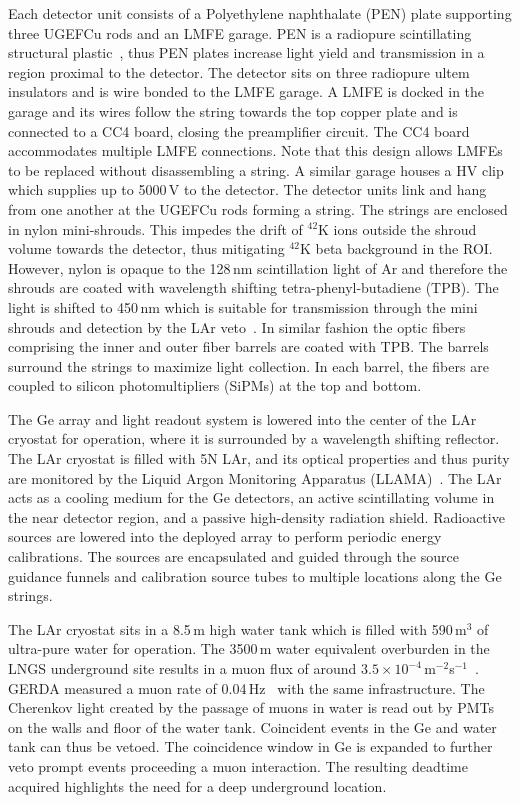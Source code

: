 Each detector unit consists of a Polyethylene naphthalate (PEN) plate supporting three UGEFCu rods and an LMFE garage. PEN is a radiopure scintillating structural plastic~\cite{pen}, thus PEN plates increase light yield and transmission in a region proximal to the detector. The detector sits on three radiopure ultem insulators and is wire bonded to the LMFE garage. A LMFE is docked in the garage and its wires follow the string towards the top copper plate and is connected to a CC4 board, closing the preamplifier circuit. The CC4 board accommodates multiple LMFE connections. Note that this design allows LMFEs to be replaced without disassembling a string. A similar garage houses a HV clip which supplies up to 5000\,V to the detector. The detector units link and hang from one another at the UGEFCu rods forming a string. The strings are enclosed in nylon mini-shrouds. This impedes the drift of $^{42}$K ions outside the shroud volume towards the detector, thus mitigating $^{42}$K beta background in the \novbb{} ROI. However, nylon is opaque to the 128\,nm scintillation light of Ar and therefore the shrouds are coated with wavelength shifting tetra-phenyl-butadiene (TPB). The light is shifted to 450\,nm which is suitable for transmission through the mini shrouds and detection by the LAr veto~\cite{gerda_upgrade}. In similar fashion the optic fibers comprising the inner and outer fiber barrels are coated with TPB. The barrels surround the strings to maximize light collection. In each barrel, the fibers are coupled to silicon photomultipliers (SiPMs) at the top and bottom. 

The Ge array and light readout system is lowered into the center of the LAr cryostat for operation, where it is surrounded by a wavelength shifting reflector. The LAr cryostat is filled with 5N LAr, and its optical properties and thus purity are monitored by the Liquid Argon Monitoring Apparatus (LLAMA)~\cite{llama}. The LAr acts as a cooling medium for the Ge detectors, an active scintillating volume in the near detector region, and a passive high-density radiation shield. Radioactive sources are lowered into the deployed array to perform periodic energy calibrations. The sources are encapsulated and guided through the source guidance funnels and calibration source tubes to multiple locations along the Ge strings.

The LAr cryostat sits in a 8.5\,m high water tank which is filled with 590\,m$^{3}$ of ultra-pure water for operation. The 3500\,m water equivalent overburden in the LNGS underground site results in a muon flux of around $3.5\times10^{-4}$\,m$^{-2}$s$^{-1}$~\cite{lngs_muon_flux}. GERDA measured a muon rate of 0.04\,Hz~\cite{gerda_muon_veto} with the same infrastructure. The Cherenkov light created by the passage of muons in water is read out by PMTs on the walls and floor of the water tank. Coincident events in the Ge and water tank can thus be vetoed. The coincidence window in Ge is expanded to further veto prompt events proceeding a muon interaction. The resulting deadtime acquired highlights the need for a deep underground location.

